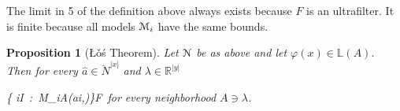 \documentclass[12pt,letterpaper,oneside,reqno]{amsart}
\theoremstyle{plain}
\newtheorem{proposition}[theorem]{Proposition}
\theoremstyle{remark}
\begin{document}
The limit in 5 of the definition above always exists because $F$ is an ultrafilter.
It is finite because all models ${\EuScript M}_i$ have the same bounds.


\begin{proposition}[\L\v{o}\'s Theorem]
  Let ${\EuScript N}$ be as above and let $\varphi(x)\in\mathds{L}(A)$. Then for every $\hat a\in\breve N^{|x|}$ and $\lambda\in\mathds{R}^{|y|}$

  {\Leftrightarrow}
  {\big\{ i\in I\ :\ {\EuScript M}_i\models\exists \alpha\in A\;\varphi(\hat ai,\alpha)\big\}\in F}\ for every neighborhood $A\ni\lambda$.

\end{proposition}
\end{document}
